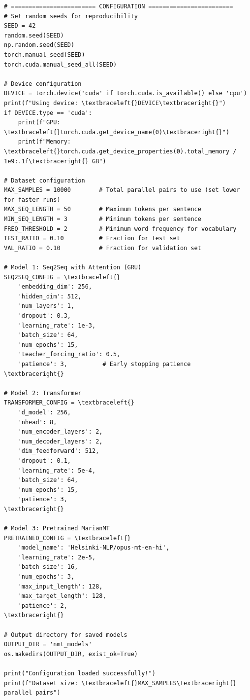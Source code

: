 \documentclass[12pt,a4paper,oneside]{report}
\begin{document}
\begin{Verbatim}[commandchars=\\\{\},breaklines=true,breakanywhere=true,fontsize=\scriptsize,frame=leftline,framesep=2mm,rulecolor=\color{gray}]
# ======================== CONFIGURATION ========================
# Set random seeds for reproducibility
SEED = 42
random.seed(SEED)
np.random.seed(SEED)
torch.manual_seed(SEED)
torch.cuda.manual_seed_all(SEED)

# Device configuration
DEVICE = torch.device('cuda' if torch.cuda.is_available() else 'cpu')
print(f"Using device: \textbraceleft{}DEVICE\textbraceright{}")
if DEVICE.type == 'cuda':
    print(f"GPU: \textbraceleft{}torch.cuda.get_device_name(0)\textbraceright{}")
    print(f"Memory: \textbraceleft{}torch.cuda.get_device_properties(0).total_memory / 1e9:.1f\textbraceright{} GB")

# Dataset configuration
MAX_SAMPLES = 10000        # Total parallel pairs to use (set lower for faster runs)
MAX_SEQ_LENGTH = 50        # Maximum tokens per sentence
MIN_SEQ_LENGTH = 3         # Minimum tokens per sentence
FREQ_THRESHOLD = 2         # Minimum word frequency for vocabulary
TEST_RATIO = 0.10          # Fraction for test set
VAL_RATIO = 0.10           # Fraction for validation set

# Model 1: Seq2Seq with Attention (GRU)
SEQ2SEQ_CONFIG = \textbraceleft{}
    'embedding_dim': 256,
    'hidden_dim': 512,
    'num_layers': 1,
    'dropout': 0.3,
    'learning_rate': 1e-3,
    'batch_size': 64,
    'num_epochs': 15,
    'teacher_forcing_ratio': 0.5,
    'patience': 3,          # Early stopping patience
\textbraceright{}

# Model 2: Transformer
TRANSFORMER_CONFIG = \textbraceleft{}
    'd_model': 256,
    'nhead': 8,
    'num_encoder_layers': 2,
    'num_decoder_layers': 2,
    'dim_feedforward': 512,
    'dropout': 0.1,
    'learning_rate': 5e-4,
    'batch_size': 64,
    'num_epochs': 15,
    'patience': 3,
\textbraceright{}

# Model 3: Pretrained MarianMT
PRETRAINED_CONFIG = \textbraceleft{}
    'model_name': 'Helsinki-NLP/opus-mt-en-hi',
    'learning_rate': 2e-5,
    'batch_size': 16,
    'num_epochs': 3,
    'max_input_length': 128,
    'max_target_length': 128,
    'patience': 2,
\textbraceright{}

# Output directory for saved models
OUTPUT_DIR = 'nmt_models'
os.makedirs(OUTPUT_DIR, exist_ok=True)

print("Configuration loaded successfully!")
print(f"Dataset size: \textbraceleft{}MAX_SAMPLES\textbraceright{} parallel pairs")
\end{Verbatim}
\end{document}
